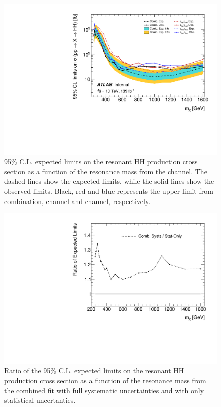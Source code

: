 \begin{figure}
\centering
\includegraphics[width=.8\textwidth]{figures/results/HH/Combined/CombSysts_21072021.pdf}
\caption{95\% C.L. expected limits on the resonant HH production cross section as a function of the resonance mass from the \hadhad channel. The dashed lines show the expected limits, while the solid lines show the observed limits. Black, red and blue represents the upper limit from combination, \lephad channel and \hadhad channel, respectively.}
\label{fig:CombinedLimits}
\end{figure}

\begin{figure}
\centering
\includegraphics[width=.8\textwidth]{figures/results/HH/Combined/ratio_CombStatSysts_21072021.pdf}
\caption{Ratio of the 95\% C.L. expected limits on the resonant HH production cross section as a function of the resonance mass from the combined fit with full systematic uncertainties and with only statistical uncertanties.}
\label{fig:CombinedLimitsRatio}
\end{figure}


